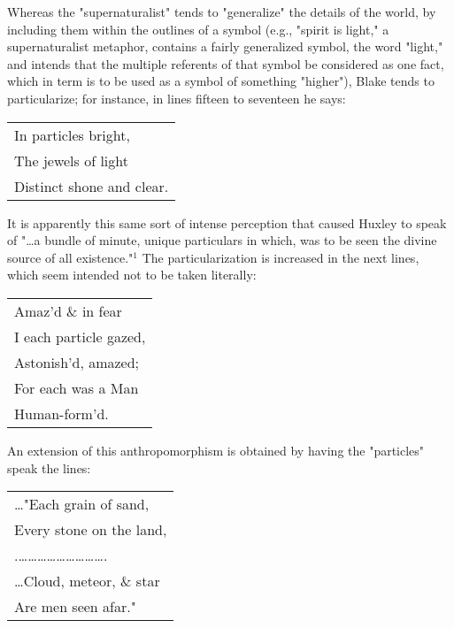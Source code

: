 Whereas the "supernaturalist" tends to "generalize" the details of the world, by
including them within the outlines of a symbol (e.g., "spirit is light," a supernaturalist metaphor,
contains a fairly generalized symbol, the word "light," and intends that the multiple
referents of that symbol be considered as one fact, which in term is to be used as a 
symbol of something "higher"), Blake tends to particularize; for instance, in lines fifteen to seventeen he says:\par
\begin{center}
	\parbox{0.8\textwidth}{
		\centering
		\begin{tabular}{l}
			In particles bright, \\
			The jewels of light  \\
			Distinct shone and clear.
		\end{tabular}
	}%
\end{center}
\hspace*{5mm}It is apparently this same sort of intense perception that caused Huxley to speak of 
"\dots a bundle of minute, unique particulars in which, was to be seen the divine source 
of all existence."$^{1}$ The particularization is increased in the next lines,
which seem intended not to be taken literally:\par
\begin{center}
	\parbox{0.8\textwidth}{
		\centering
		\begin{tabular}{l}
			Amaz'd \& in fear      \\
			I each particle gazed, \\
			Astonish'd, amazed;    \\
			For each was a Man     \\
			Human-form'd.
		\end{tabular}
	}%
\end{center}
\hspace*{5mm}An extension of this anthropomorphism is obtained by having the "particles"
speak the lines:\par
\begin{center}
	\parbox{0.8\textwidth}{
		\centering
		\begin{tabular}{l}
			\dots"Each grain of sand,                       \\
			Every stone on the land,                        \\
			.\dots\dots\dots\dots\dots\dots\dots\dots\dots. \\
			\dots Cloud, meteor, \& star                    \\
			Are men seen afar."
		\end{tabular}
	}%
\end{center}
